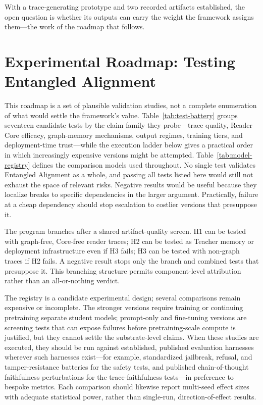 With a trace-generating prototype and two recorded artifacts established, the
open question is whether its outputs can carry the weight the framework assigns
them---the work of the roadmap that follows.

\section{Experimental Roadmap: Testing Entangled Alignment}
\label{sec:experimental-roadmap}
\label{sec:experiments}

This roadmap is a set of plausible validation studies, not a complete
enumeration of what would settle the framework's value. Table~\ref{tab:test-battery}
groups seventeen candidate tests by the claim family they probe---trace quality,
Reader Core efficacy, graph-memory mechanisms, output regimes, training tiers,
and deployment-time trust---while the execution ladder below gives a practical
order in which increasingly expensive versions might be attempted.
Table~\ref{tab:model-registry} defines the comparison models used throughout.
No single test validates Entangled Alignment as a whole, and passing all tests
listed here would still not exhaust the space of relevant risks. Negative
results would be useful because they localize breaks to specific dependencies
in the larger argument. Practically, failure at a cheap dependency should stop
escalation to costlier versions that presuppose it.

The program branches after a shared artifact-quality screen. H1 can be tested
with graph-free, Core-free reader traces; H2 can be tested as Teacher memory or
deployment infrastructure even if H3 fails; H3 can be tested with non-graph
traces if H2 fails. A negative result stops only the branch and combined tests
that presuppose it. This branching structure permits component-level attribution
rather than an all-or-nothing verdict.

The registry is a candidate experimental design; several comparisons remain
expensive or incomplete. The stronger versions require training or
continuing pretraining separate student models; prompt-only and fine-tuning
versions are screening tests that can expose failures before pretraining-scale
compute is justified, but they cannot settle the substrate-level claims.
When these studies are executed, they should be run against established,
published evaluation harnesses wherever such harnesses exist---for example,
standardized jailbreak, refusal, and tamper-resistance batteries for the safety
tests, and published chain-of-thought faithfulness perturbations for the
trace-faithfulness tests---in preference to bespoke metrics. Each comparison
should likewise report multi-seed effect sizes with adequate statistical power,
rather than single-run, direction-of-effect results.

